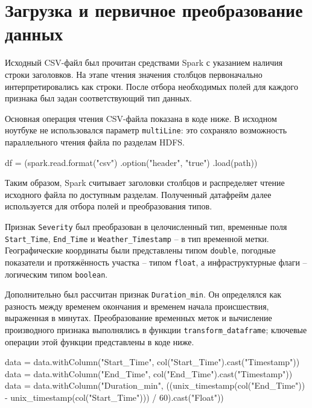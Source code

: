 \vspace{\baselineskip}
\section{Загрузка и первичное преобразование данных}
\vspace{\baselineskip}

Исходный CSV-файл был прочитан средствами Spark с указанием наличия строки заголовков. На этапе чтения значения столбцов первоначально интерпретировались как строки. После отбора необходимых полей для каждого признака был задан соответствующий тип данных.

Основная операция чтения CSV-файла показана в коде ниже. В исходном ноутбуке не использовался параметр \texttt{multiLine}: это сохраняло возможность параллельного чтения файла по разделам HDFS.

\begin{code}
df = (spark.read.format("csv")
      .option("header", "true")
      .load(path))
\end{code}

Таким образом, Spark считывает заголовки столбцов и распределяет чтение исходного файла по доступным разделам. Полученный датафрейм далее используется для отбора полей и преобразования типов.

Признак \texttt{Severity} был преобразован в целочисленный тип, временные поля \texttt{Start\_Time}, \texttt{End\_Time} и \texttt{Weather\_Timestamp} -- в тип временной метки. Географические координаты были представлены типом \texttt{double}, погодные показатели и протяжённость участка -- типом \texttt{float}, а инфраструктурные флаги -- логическим типом \texttt{boolean}.

Дополнительно был рассчитан признак \texttt{Duration\_min}. Он определялся как разность между временем окончания и временем начала происшествия, выраженная в минутах. Преобразование временных меток и вычисление производного признака выполнялись в функции \texttt{transform\_dataframe}; ключевые операции этой функции представлены в коде ниже.

\begin{code}
data = data.withColumn("Start_Time",
                       col("Start_Time").cast("Timestamp"))
data = data.withColumn("End_Time",
                       col("End_Time").cast("Timestamp"))
data = data.withColumn("Duration_min",
    ((unix_timestamp(col("End_Time")) -
      unix_timestamp(col("Start_Time"))) / 60).cast("Float"))
\end{code}

